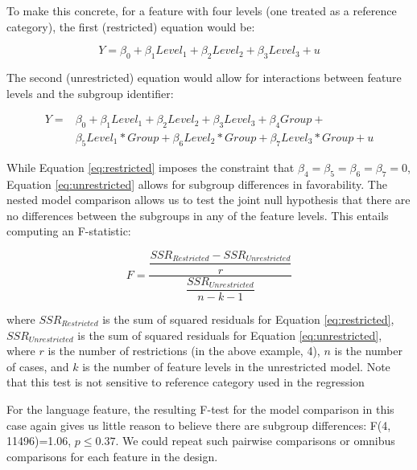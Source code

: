 \documentclass[a4paper,12pt]{article}\usepackage[]{graphicx}\usepackage[]{color}
\begin{document}
To make this concrete, for a feature with four levels (one treated as a reference category), the first (restricted) equation would be:

\begin{equation}\label{eq:restricted}
Y = \beta_0 + \beta_1 Level_1 + \beta_2 Level_2 + \beta_3 Level_3 + u
\end{equation}

\noindent The second (unrestricted) equation would allow for interactions between feature levels and the subgroup identifier:

\begin{equation}\label{eq:unrestricted}
\begin{split}
Y = & \beta_0 + \beta_1 Level_1 + \beta_2 Level_2 + \beta_3 Level_3 + \beta_4 Group + \\
& \beta_5 Level_1 * Group + \beta_6 Level_2 * Group + \beta_7 Level_3 * Group + u
\end{split}
\end{equation}

\noindent While Equation \ref{eq:restricted} imposes the constraint that $\beta_4 = \beta_5 = \beta_6 = \beta_7 = 0$, Equation \ref{eq:unrestricted} allows for subgroup differences in favorability. The nested model comparison allows us to test the joint null hypothesis that there are no differences between the subgroups in any of the feature levels. This entails computing an F-statistic:

\begin{equation}
F = \dfrac{\dfrac{SSR_{Restricted} - SSR_{Unrestricted}}{r}}{\dfrac{SSR_{Unrestricted}}{n - k - 1}}
\end{equation}

\noindent where $SSR_{Restricted}$ is the sum of squared residuals for Equation \ref{eq:restricted}, $SSR_{Unrestricted}$ is the sum of squared residuals for Equation \ref{eq:unrestricted}, where $r$ is the number of restrictions (in the above example, 4), $n$ is the number of cases, and $k$ is the number of feature levels in the unrestricted model. Note that this test is not sensitive to reference category used in the regression 


For the \citeauthor{HainmuellerHopkinsYamamoto2014} language feature, the resulting F-test for the model comparison in this case again gives us little reason to believe there are subgroup differences: F(4, 11496)=1.06, $p\leq0.37$. We could repeat such pairwise comparisons or omnibus comparisons for each feature in the design.
\end{document}
